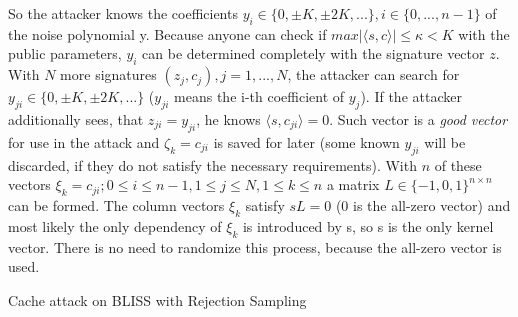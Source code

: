 So the attacker knows the coefficients $y_i \in \{0, \pm K, \pm 2K,...\}, i \in \{0,...,n-1\}$ of the noise polynomial y. Because anyone can check if $max|\langle s,c \rangle |\le \kappa < K$ with the public parameters, $y_i$ can be determined completely with the signature vector $z$. With $N$ more signatures $(z_j, c_j), j =1,...,N$, the attacker can search for  $y_{ji} \in \{0, \pm K, \pm 2K,...\}$ ($y_{ji}$ means the i-th coefficient of $y_j$). If the attacker additionally sees, that $z_{ji} = y_{ji}$, he knows $\langle s, c_{ji} \rangle = 0$. Such vector is a \textit{good vector} for use in the attack and $\zeta _k = c_{ji}$ is saved for later (some known $y_{ji}$ will be discarded, if they do not satisfy the necessary requirements). With $n$ of these vectors $\xi _k = c_{ji}; 0 \le i \le n-1, 1 \le j \le N, 1\le k \le n$ a matrix $L \in \{-1,0,1\}^{n{\times}n}$ can be formed. The column vectors $\xi_k$ satisfy $sL = 0$ (0 is the all-zero vector) and most likely the only dependency of $\xi_k$ is introduced by s, so s is the only kernel vector. There is no need to randomize this process, because the all-zero vector is used.

\begin{algorithm}
	\caption{Cache attack on BLISS with Rejection Sampling}
	\label{algrctattack}
	\begin{algorithmic}[1]
				\EndIf
			\EndFor
		\EndWhile
			\State{}
		\EndFor
	\end{algorithmic}
\end{algorithm}   

